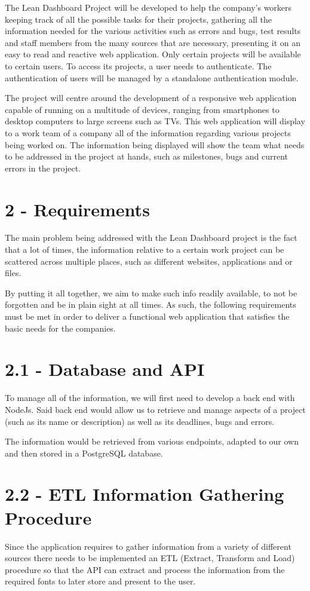 \documentclass[a4paper,twoside,10pt]{article}
\begin{document}
The Lean Dashboard Project will be developed to help the company’s workers keeping track of all the possible tasks for their projects, gathering all the information needed for the various activities such as errors and bugs, test results and staff members from the many sources that are necessary, presenting it on an easy to read and reactive web application. Only certain projects will be available to certain users. To access its projects, a user needs to authenticate. The authentication of users will be managed by a standalone authentication module.

The project will centre around the development of a responsive web application capable of running on a multitude of devices, ranging from smartphones to desktop computers to large screens such as TVs. This web application will display to a work team of a company all of the information regarding various projects being worked on. 
The information being displayed will show the team what needs to be addressed in the project at hands, such as milestones, bugs and current errors in the project.

\pagebreak
\section*{2 - Requirements}
The main problem being addressed with the Lean Dashboard project is the fact that a lot of times, the information relative to a certain work project can be scattered across multiple places, such as different websites, applications and or files.

By putting it all together, we aim to make such info readily available, to not be forgotten and be in plain sight at all times.
As such, the following requirements must be met in order to deliver a functional web application that satisfies the basic needs for the companies.


\section*{2.1 - Database and API}
To manage all of the information, we will first need to develop a back end with NodeJs. Said back end would allow us to retrieve and manage aspects of a project (such as its name or description) as well as its deadlines, bugs and errors. 

The information would be retrieved from various endpoints, adapted to our own and then stored in a PostgreSQL database.

\section*{2.2 - ETL Information Gathering Procedure}
Since the application requires to gather information from a variety of different sources there needs to be implemented an ETL\cite{ETLPROC} (Extract, Transform and Load) procedure so that the API can extract and process the information from the required fonts to later store and present to the user.
\end{document}
